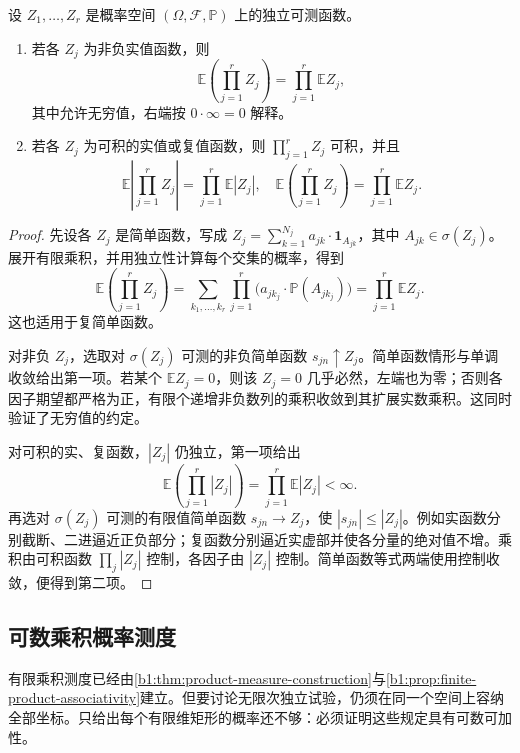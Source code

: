 \begin{proposition}\label{b1:prop:30-independent-expectations}
设 \(Z_1,\ldots,Z_r\) 是概率空间 \((\Omega,\mathcal F,\mathbb P)\) 上的独立可测函数。
\begin{enumerate}
 \item 若各 \(Z_j\) 为非负实值函数，则
 \[
  \mathbb E\left(\prod_{j=1}^rZ_j\right)=\prod_{j=1}^r\mathbb E Z_j,
 \]
 其中允许无穷值，右端按 \(0\cdot\infty=0\) 解释。
 \item 若各 \(Z_j\) 为可积的实值或复值函数，则 \(\prod_{j=1}^rZ_j\) 可积，并且
 \[
  \mathbb E\left|\prod_{j=1}^rZ_j\right|=\prod_{j=1}^r\mathbb E|Z_j|,
  \quad
  \mathbb E\left(\prod_{j=1}^rZ_j\right)=\prod_{j=1}^r\mathbb E Z_j.
 \]
\end{enumerate}
\end{proposition}
\begin{proof}
先设各 \(Z_j\) 是简单函数，写成 \(Z_j=\sum_{k=1}^{N_j}a_{jk}\cdot\mathbf1_{A_{jk}}\)，其中 \(A_{jk}\in\sigma(Z_j)\)。展开有限乘积，并用独立性计算每个交集的概率，得到
\[
 \mathbb E\left(\prod_{j=1}^rZ_j\right)
 =\sum_{k_1,\ldots,k_r}\prod_{j=1}^r
 \bigl(a_{j k_j}\cdot\mathbb P(A_{j k_j})\bigr)
 =\prod_{j=1}^r\mathbb E Z_j.
\]
这也适用于复简单函数。

对非负 \(Z_j\)，选取对 \(\sigma(Z_j)\) 可测的非负简单函数 \(s_{jn}\uparrow Z_j\)。简单函数情形与单调收敛给出第一项。若某个 \(\mathbb E Z_j=0\)，则该 \(Z_j=0\) 几乎必然，左端也为零；否则各因子期望都严格为正，有限个递增非负数列的乘积收敛到其扩展实数乘积。这同时验证了无穷值的约定。

对可积的实、复函数，\(|Z_j|\) 仍独立，第一项给出
\[
 \mathbb E\left(\prod_{j=1}^r|Z_j|\right)
 =\prod_{j=1}^r\mathbb E|Z_j|<\infty.
\]
再选对 \(\sigma(Z_j)\) 可测的有限值简单函数 \(s_{jn}\to Z_j\)，使 \(|s_{jn}|\leq|Z_j|\)。例如实函数分别截断、二进逼近正负部分；复函数分别逼近实虚部并使各分量的绝对值不增。乘积由可积函数 \(\prod_j|Z_j|\) 控制，各因子由 \(|Z_j|\) 控制。简单函数等式两端使用控制收敛，便得到第二项。
\end{proof}

\subsection{可数乘积概率测度}
\label{b1:subsec:300203}

有限乘积测度已经由\cref{b1:thm:product-measure-construction}与\cref{b1:prop:finite-product-associativity}建立。但要讨论无限次独立试验，仍须在同一个空间上容纳全部坐标。只给出每个有限维矩形的概率还不够：必须证明这些规定具有可数可加性。

